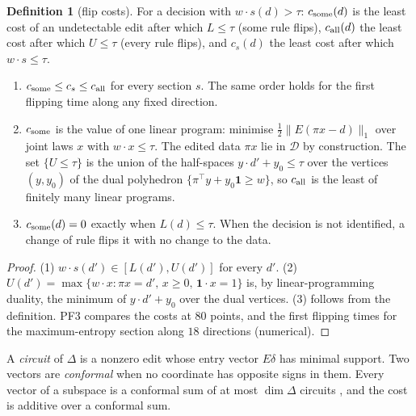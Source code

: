 \documentclass[11pt]{article}
\theoremstyle{definition}\newtheorem{definition}[theorem]{Definition}\newtheorem{remark}[theorem]{Remark}\newtheorem{example}[theorem]{Example}\newtheorem{problem}[theorem]{Open problem}\crefname{problem}{Problem}{Problems}
\begin{document}
\begin{definition}[flip costs]\label{def:flipcost}
For a decision with $w\cdot s(d)>\tau$: $c_{\rm some}(d)$ is the least cost of an undetectable edit after which $L\le\tau$ (some rule flips), $c_{\rm all}(d)$ the least cost after which $U\le\tau$ (every rule flips), and $c_s(d)$ the least cost after which $w\cdot s\le\tau$.
\end{definition}

\begin{proposition}\label{prop:twothresh}
\begin{enumerate}
\item[(1)] $c_{\rm some}\le c_s\le c_{\rm all}$ for every section $s$. The same order holds for the first flipping time along any fixed direction.
\item[(2)] $c_{\rm some}$ is the value of one linear program: minimise $\tfrac12\|E(\pi x-d)\|_1$ over joint laws $x$ with $w\cdot x\le\tau$. The edited data $\pi x$ lie in $\mathcal D$ by construction. The set $\{U\le\tau\}$ is the union of the half-spaces $y\cdot d'+y_0\le\tau$ over the vertices $(y,y_0)$ of the dual polyhedron $\{\pi^{\!\top}y+y_0\mathbf 1\ge w\}$, so $c_{\rm all}$ is the least of finitely many linear programs.
\item[(3)] $c_{\rm some}(d)=0$ exactly when $L(d)\le\tau$. When the decision is not identified, a change of rule flips it with no change to the data.
\end{enumerate}
\end{proposition}

\begin{proof}
(1) $w\cdot s(d')\in[L(d'),U(d')]$ for every $d'$. (2) $U(d')=\max\{w\cdot x:\pi x=d',\,x\ge0,\,\mathbf 1\cdot x=1\}$ is, by linear-programming duality, the minimum of $y\cdot d'+y_0$ over the dual vertices. (3) follows from the definition. PF3 compares the costs at $80$ points, and the first flipping times for the maximum-entropy section along $18$ directions (numerical).
\end{proof}

A \emph{circuit} of $\Delta$ is a nonzero edit whose entry vector $E\delta$ has minimal support. Two vectors are \emph{conformal} when no coordinate has opposite signs in them. Every vector of a subspace is a conformal sum of at most $\dim\Delta$ circuits \cite{Rockafellar1969,MullerRegensburger2016}, and the cost is additive over a conformal sum.
\end{document}
